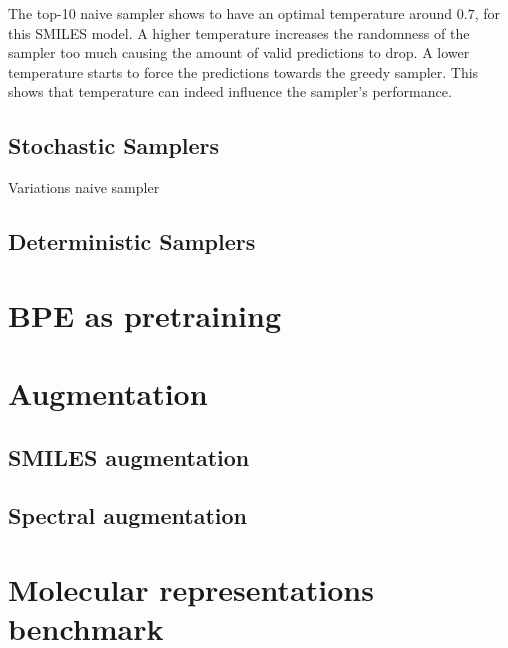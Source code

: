 The top-10 naive sampler shows to have an optimal temperature around $0.7$, for this SMILES model.
A higher temperature increases the randomness of the sampler too much causing the amount of valid predictions to drop.
A lower temperature starts to force the predictions towards the greedy sampler.
This shows that temperature can indeed influence the sampler's performance.

\subsection{Stochastic Samplers}

Variations naive sampler

\subsection{Deterministic Samplers}


\section{\ac{BPE} as pretraining}


\section{Augmentation}

\subsection{SMILES augmentation}

\subsection{Spectral augmentation}


\section{Molecular representations benchmark}